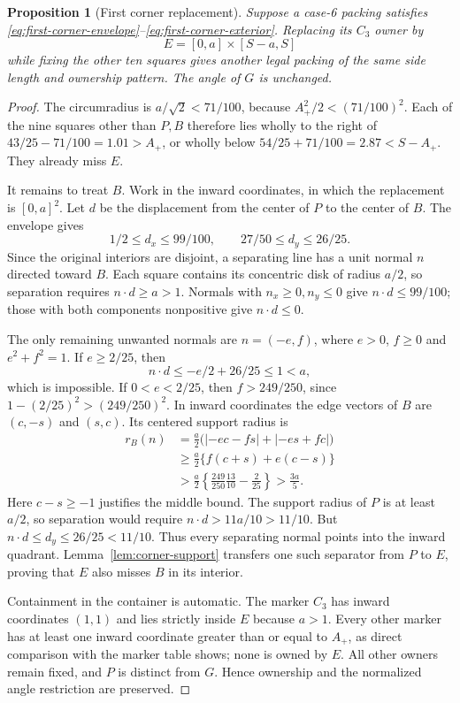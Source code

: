 \documentclass[11pt]{article}
\newtheorem{proposition}[theorem]{Proposition}
\begin{document}
\begin{proposition}[First corner replacement]\label{prop:first-corner}
Suppose a case-6 packing satisfies
\eqref{eq:first-corner-envelope}--\eqref{eq:first-corner-exterior}.
Replacing its $C_3$ owner by
\[
 E=[0,a]\times[S-a,S]
\]
while fixing the other ten squares gives another legal packing of the
same side length and ownership pattern. The angle of $G$ is unchanged.
\end{proposition}
\begin{proof}
The circumradius is $a/\sqrt2<71/100$, because
$A_+^2/2<(71/100)^2$. Each of the nine squares other than $P,B$
therefore lies wholly to the right of
$43/25-71/100=1.01>A_+$, or wholly below
$54/25+71/100=2.87<S-A_+$. They already miss $E$.

It remains to treat $B$. Work in the inward coordinates, in which the
replacement is $[0,a]^2$. Let $d$ be the displacement from the center
of $P$ to the center of $B$. The envelope gives
\[
 1/2\le d_x\le99/100,\qquad27/50\le d_y\le26/25.
\]
Since the original interiors are disjoint, a separating line has a unit
normal $n$ directed toward $B$. Each square contains its concentric disk
of radius $a/2$, so separation requires $n\cdot d\ge a>1$.
Normals with $n_x\ge0,n_y\le0$ give $n\cdot d\le99/100$;
those with both components nonpositive give $n\cdot d\le0$.

The only remaining unwanted normals are $n=(-e,f)$, where
$e>0$, $f\ge0$ and $e^2+f^2=1$. If $e\ge2/25$, then
\[
 n\cdot d\le-e/2+26/25\le1<a,
\]
which is impossible. If $0<e<2/25$, then $f>249/250$, since
$1-(2/25)^2>(249/250)^2$. In inward coordinates the edge vectors
of $B$ are $(c,-s)$ and $(s,c)$. Its centered support radius is
\[
\begin{aligned}
 r_B(n)&=\frac a2\bigl(|-ec-fs|+|-es+fc|\bigr)\\
 &\ge\frac a2\{f(c+s)+e(c-s)\}\\
 &>\frac a2\left\{\frac{249}{250}\frac{13}{10}-\frac2{25}\right\}
 >\frac{3a}{5}.
\end{aligned}
\]
Here $c-s\ge-1$ justifies the middle bound. The support radius of
$P$ is at least $a/2$, so separation would require
$n\cdot d>11a/10>11/10$. But $n\cdot d\le d_y\le26/25<11/10$.
Thus every separating normal points into the inward quadrant.
Lemma~\ref{lem:corner-support} transfers one such separator from $P$
to $E$, proving that $E$ also misses $B$ in its interior.

Containment in the container is automatic. The marker $C_3$ has inward
coordinates $(1,1)$ and lies strictly inside $E$ because $a>1$.
Every other marker has at least one inward coordinate greater than or
equal to $A_+$, as direct comparison with the marker table shows; none
is owned by $E$. All other owners remain fixed, and $P$ is distinct from
$G$. Hence ownership and the normalized angle restriction are preserved.
\end{proof}
\end{document}
